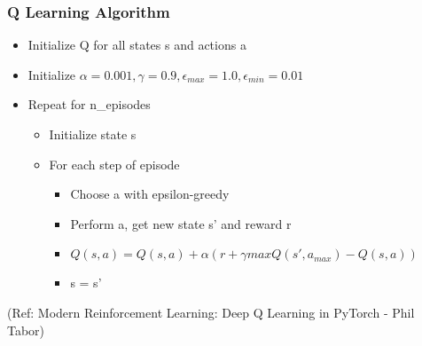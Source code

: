 \begin{frame}[fragile]\frametitle{Q Learning Algorithm}

\begin{itemize}
\item Initialize Q for all states s and actions a 
\item Initialize $\alpha=0.001,\gamma=0.9,\epsilon_{max}=1.0,\epsilon_{min}=0.01$
\item Repeat for n\_episodes
	\begin{itemize}
	\item Initialize state s 
	\item For each step of episode
		\begin{itemize}
		\item Choose a with epsilon-greedy 
		\item Perform a, get new state s' and reward r 
		\item $Q(s ,a)=Q(s,a)+ \alpha (r + \gamma max Q(s' ,a_{max})- Q(s ,a))$
		\item s = s'
		\end{itemize}
	\end{itemize}
\end{itemize}

{\tiny (Ref: Modern Reinforcement Learning: Deep Q Learning in PyTorch - Phil Tabor)}

\end{frame}








